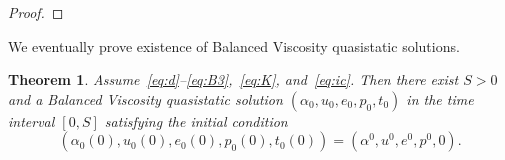 \documentclass[reqno]{amsart}
\newtheorem{theorem}[corollary]{Theorem}
\theoremstyle{definition}
\numberwithin{equation}{section}
\def\de {\mathrm{d}}
\def\C {\mathbb C}
\def\EE {\mathrm{E}}
\begin{document}
\begin{proof}
%
\end{proof}

We eventually prove existence of Balanced Viscosity quasistatic solutions. 

\begin{theorem}\label{thm:BV_evol}
Assume~\eqref{eq:d}--\eqref{eq:B3},~\eqref{eq:K}, and~\eqref{eq:ic}. Then there exist $S>0$ and a Balanced Viscosity quasistatic solution $(\alpha_0,u_0,e_0,p_0,t_0)$ in the time interval $[0,S]$ satisfying the initial condition
\begin{equation}\label{eq:0_in-con}
(\alpha_0(0),u_0(0),e_0(0),p_0(0),t_0(0))=(\alpha^0,u^0,e^0,p^0,0).
\end{equation}
\end{theorem}
\end{document}
